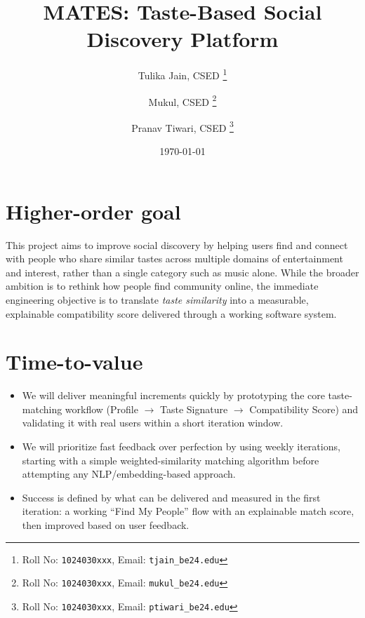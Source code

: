 \documentclass[11pt,a4paper]{article}
\title{MATES: Taste-Based Social Discovery Platform}
\author{
  Tulika Jain, CSED%
  \thanks{Roll No: \texttt{1024030xxx}, %
    Email: \texttt{tjain\_be24\@thapar.edu}}
  \and 
  Mukul, CSED%
  \thanks{Roll No: \texttt{1024030xxx}, %
    Email: \texttt{mukul\_be24\@thapar.edu}}
  \and
  Pranav Tiwari, CSED%
  \thanks{Roll No: \texttt{1024030xxx}, %
    Email: \texttt{ptiwari\_be24\@thapar.edu}}
}
\date{\today}
\begin{document}
\maketitle

\section{Higher-order goal}
This project aims to improve social discovery by helping users find and connect with people
who share similar tastes across multiple domains of entertainment and interest, rather than
a single category such as music alone. While the broader ambition is to rethink how people
find community online, the immediate engineering objective is to translate \emph{taste
similarity} into a measurable, explainable compatibility score delivered through a working
software system.

\section{Time-to-value}
\begin{itemize}[leftmargin=0.7cm]
    \item We will deliver meaningful increments quickly by prototyping the core taste-matching workflow (Profile $\rightarrow$ Taste Signature $\rightarrow$ Compatibility Score) and validating it with real users within a short iteration window.
    \item We will prioritize fast feedback over perfection by using weekly iterations, starting with a simple weighted-similarity matching algorithm before attempting any NLP/embedding-based approach.
    \item Success is defined by what can be delivered and measured in the first iteration: a working ``Find My People'' flow with an explainable match score, then improved based on user feedback.
\end{itemize}
\end{document}
